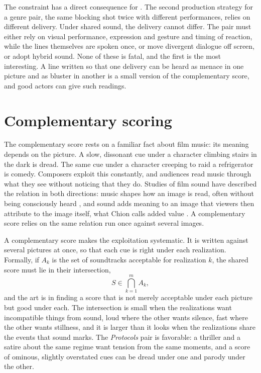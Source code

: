 The constraint has a direct consequence for . The second production strategy for a genre pair, the same blocking shot twice with different performances, relies on different delivery. Under shared sound, the delivery cannot differ. The pair must either rely on visual performance, expression and gesture and timing of reaction, while the lines themselves are spoken once, or move divergent dialogue off screen, or adopt hybrid sound. None of these is fatal, and the first is the most interesting. A line written so that one delivery can be heard as menace in one picture and as bluster in another is a small version of the complementary score, and good actors can give such readings.

\section{Complementary scoring}

The complementary score rests on a familiar fact about film music: its meaning depends on the picture. A slow, dissonant cue under a character climbing stairs in the dark is dread. The same cue under a character creeping to raid a refrigerator is comedy. Composers exploit this constantly, and audiences read music through what they see without noticing that they do. Studies of film sound have described the relation in both directions: music shapes how an image is read, often without being consciously heard \cite{gorbman}, and sound adds meaning to an image that viewers then attribute to the image itself, what Chion calls added value \cite{chion}. A complementary score relies on the same relation run once against several images.

A complementary score makes the exploitation systematic. It is written against several pictures at once, so that each cue is right under each realization. Formally, if $A_k$ is the set of soundtracks acceptable for realization $k$, the shared score must lie in their intersection,
\begin{equation}
S\in\bigcap_{k=1}^{m}A_k,
\end{equation}
and the art is in finding a score that is not merely acceptable under each picture but good under each. The intersection is small when the realizations want incompatible things from sound, loud where the other wants silence, fast where the other wants stillness, and it is larger than it looks when the realizations share the events that sound marks. The \emph{Protocols} pair is favorable: a thriller and a satire about the same regime want tension from the same moments, and a score of ominous, slightly overstated cues can be dread under one and parody under the other.

